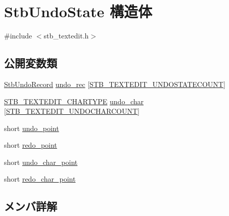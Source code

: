 \hypertarget{struct_stb_undo_state}{}\section{Stb\+Undo\+State 構造体}
\label{struct_stb_undo_state}


{\ttfamily \#include $<$stb\+\_\+textedit.\+h$>$}

\subsection*{公開変数類}
\begin{DoxyCompactItemize}
\item 
\mbox{\hyperlink{struct_stb_undo_record}{Stb\+Undo\+Record}} \mbox{\hyperlink{struct_stb_undo_state_a8cb07be8f304d1620b50bd024709023f}{undo\+\_\+rec}} \mbox{[}\mbox{\hyperlink{stb__textedit_8h_afa79483143df87a1497010712b3dfaf9}{S\+T\+B\+\_\+\+T\+E\+X\+T\+E\+D\+I\+T\+\_\+\+U\+N\+D\+O\+S\+T\+A\+T\+E\+C\+O\+U\+NT}}\mbox{]}
\item 
\mbox{\hyperlink{stb__textedit_8h_a6e64031a061922e3a48d88fd8623f4c3}{S\+T\+B\+\_\+\+T\+E\+X\+T\+E\+D\+I\+T\+\_\+\+C\+H\+A\+R\+T\+Y\+PE}} \mbox{\hyperlink{struct_stb_undo_state_a88320a054aaf18ca122c2b23903a8677}{undo\+\_\+char}} \mbox{[}\mbox{\hyperlink{stb__textedit_8h_a15cbcac55cf92003c28c44734422756a}{S\+T\+B\+\_\+\+T\+E\+X\+T\+E\+D\+I\+T\+\_\+\+U\+N\+D\+O\+C\+H\+A\+R\+C\+O\+U\+NT}}\mbox{]}
\item 
short \mbox{\hyperlink{struct_stb_undo_state_ad29a8695b3e8252ac164d0c2d0be7d7c}{undo\+\_\+point}}
\item 
short \mbox{\hyperlink{struct_stb_undo_state_a719ba014b2db8a8ea55739664b445af0}{redo\+\_\+point}}
\item 
short \mbox{\hyperlink{struct_stb_undo_state_ad5c08b1f8c24678c44407f0ca805afcf}{undo\+\_\+char\+\_\+point}}
\item 
short \mbox{\hyperlink{struct_stb_undo_state_a928f655e4af8945a14d99e944441704a}{redo\+\_\+char\+\_\+point}}
\end{DoxyCompactItemize}


\subsection{メンバ詳解}
\mbox{\label{struct_stb_undo_state_a928f655e4af8945a14d99e944441704a}} 
